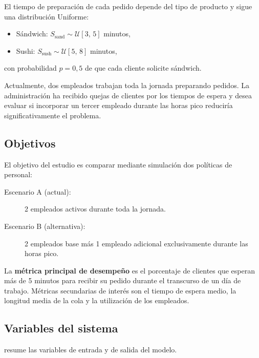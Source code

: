 El tiempo de preparación de cada pedido depende del tipo de producto y sigue
una distribución Uniforme:
\begin{itemize}
  \item Sándwich: $S_{\text{sand}} \sim \mathcal{U}[3{,}\,5]$ minutos,
  \item Sushi:    $S_{\text{sush}} \sim \mathcal{U}[5{,}\,8]$ minutos,
\end{itemize}
con probabilidad $p = 0{,}5$ de que cada cliente solicite sándwich.

Actualmente, dos empleados trabajan toda la jornada preparando pedidos.
La administración ha recibido quejas de clientes por los tiempos de espera y
desea evaluar si incorporar un tercer empleado durante las horas pico reduciría
significativamente el problema.

\subsection{Objetivos}

El objetivo del estudio es comparar mediante simulación dos políticas de
personal:
\begin{description}
  \item[Escenario A (actual):] 2 empleados activos durante toda la jornada.
  \item[Escenario B (alternativa):] 2 empleados base más 1 empleado adicional
    exclusivamente durante las horas pico.
\end{description}

La \textbf{métrica principal de desempeño} es el porcentaje de clientes que
esperan más de 5 minutos para recibir su pedido durante el transcurso de un
día de trabajo.
Métricas secundarias de interés son el tiempo de espera medio, la longitud
media de la cola y la utilización de los empleados.

\subsection{Variables del sistema}

 resume las variables de entrada y de salida del modelo.


